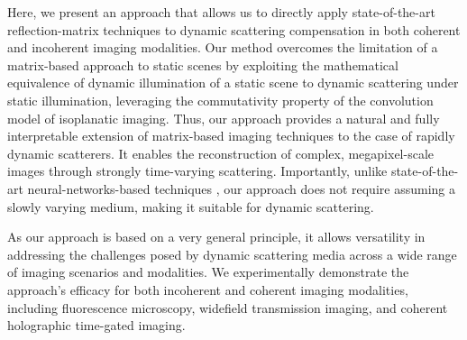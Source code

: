 \documentclass[pdflatex,sn-mathphys-num]{sn-jnl}%
\theoremstyle{thmstyleone}%
\theoremstyle{thmstyletwo}%
\theoremstyle{thmstylethree}%
\begin{document}
Here, we present an approach that allows us to directly apply state-of-the-art reflection-matrix techniques to dynamic scattering compensation in both coherent and incoherent imaging modalities. Our method overcomes the limitation of a matrix-based approach to static scenes by exploiting the mathematical equivalence of dynamic illumination of a static scene to dynamic scattering under static illumination, leveraging the commutativity property of the convolution model of isoplanatic imaging. Thus, our approach provides a natural and fully interpretable extension of matrix-based imaging techniques to the case of rapidly dynamic scatterers. It enables the reconstruction of complex, megapixel-scale images through strongly time-varying scattering. Importantly, unlike state-of-the-art neural-networks-based techniques \cite{feng23}, our approach does not require assuming a slowly varying medium, making it suitable for dynamic scattering.


As our approach is based on a very general principle, it allows versatility in addressing the challenges posed by dynamic scattering media across a wide range of imaging scenarios and modalities. 
We experimentally demonstrate the approach's efficacy for both incoherent and coherent imaging modalities, including fluorescence microscopy, widefield transmission imaging, and coherent holographic time-gated imaging.

\end{document}
